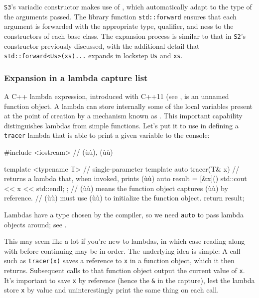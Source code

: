 \noindent \lstinline!S3!'s variadic constructor makes use of , which automatically adapt to the type of the arguments
passed. The library function \lstinline!std::forward! ensures that each
argument is forwarded with the appropriate type, qualifier, and
ness to the constructors of each base class. The expansion
process is similar to that in \lstinline!S2!'s constructor previously
discussed, with the additional detail that
\lstinline!std::forward<Us>(xs)...! expands in lockstep \lstinline!Us! and
\lstinline!xs!.

\subsubsection[Expansion in a lambda capture list]{Expansion in a lambda capture list}\label{expansion-in-a-lambda-capture-list}

A C++ lambda expression, introduced with C++11 (see , is an unnamed function object. A lambda can store
internally some of the local variables present at the point of creation
by a mechanism known as . This important
capability distinguishes lambdas from simple functions. Let's put it to
use in defining a \lstinline!tracer! lambda that is able to print a given
variable to the console:

\begin{emcppslisting}[emcppsbatch=e30,emcppsstandards={c++14}]
#include <iostream>  // (ù{}ù), (ù{}ù)

template <typename T>  // single-parameter template
auto tracer(T& x)      // returns a lambda that, when invoked, prints (ù{}ù)
{
    auto result = [&x]() { std::cout << x << std::endl; };
        // (ù{\codeincomments{[\&x]}}ù) means the function object captures (ù{}ù) by reference.
        // (ù{}ù) must use (ù{}ù) to initialize the function object.
    return result;
}
\end{emcppslisting}
    

\noindent Lambdas have a type chosen by the compiler, so we need \lstinline!auto! to
pass lambda objects around; see .

This may seem like a lot if you're new to lambdas, in which case reading
 along with 
before continuing may be in order. The
underlying idea is simple: A call such as \lstinline!tracer(x)! saves a
reference to \lstinline!x! in a function object, which it then returns.
Subsequent calls to that function object output the current value of
\lstinline!x!. It's important to save \lstinline!x! by reference (hence the
\lstinline!&! in the capture), lest the lambda store \lstinline!x! by value
and uninterestingly print the same thing on each call.

